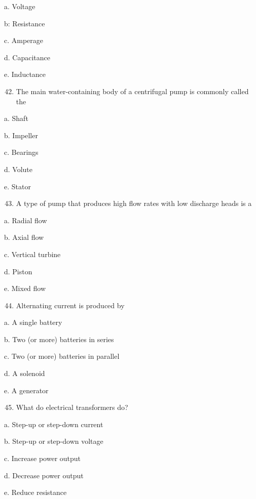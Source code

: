\documentclass[10pt]{article}
\begin{document}
\begin{enumerate}
\begin{enumerate}
a. Voltage

b: Resistance

c. Amperage

d. Capacitance

e. Inductance

\begin{enumerate}
  \setcounter{enumi}{41}
  \item The main water-containing body of a centrifugal pump is commonly called the
\end{enumerate}

a. Shaft

b. Impeller

c. Bearings

d. Volute

e. Stator

\begin{enumerate}
  \setcounter{enumi}{42}
  \item A type of pump that produces high flow rates with low discharge heads is a
\end{enumerate}

a. Radial flow

b. Axial flow

c. Vertical turbine

d. Piston

e. Mixed flow

\begin{enumerate}
  \setcounter{enumi}{43}
  \item Alternating current is produced by
\end{enumerate}

a. A single battery

b. Two (or more) batteries in series

c. Two (or more) batteries in parallel

d. A solenoid

e. A generator

\begin{enumerate}
  \setcounter{enumi}{44}
  \item What do electrical transformers do?
\end{enumerate}

a. Step-up or step-down current

b. Step-up or step-down voltage

c. Increase power output

d. Decrease power output

e. Reduce resistance


\end{enumerate}
\end{enumerate}
\end{document}
